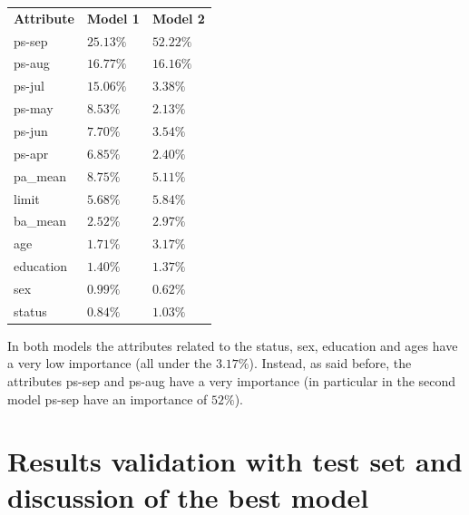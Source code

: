 \begin{table}[h]
\centering
\begin{adjustbox}{width=.3\textwidth}
\small
\begin{tabular}{lll}
\textbf{Attribute}  & \textbf{Model 1} & \textbf{Model 2} \\ \rowcolor[HTML]{EFEFEF} 
 ps-sep             &  $25.13\%$       & $52.22\%$        \\
 ps-aug             &  $16.77\%$       & $16.16\%$        \\ \rowcolor[HTML]{EFEFEF} 
 ps-jul             &  $15.06\%$       & $3.38\%$         \\
 ps-may             &  $8.53\%$        & $2.13\%$         \\ \rowcolor[HTML]{EFEFEF} 
 ps-jun             &  $7.70\%$        & $3.54\%$         \\
 ps-apr             &  $6.85\%$        & $2.40\%$         \\ \rowcolor[HTML]{EFEFEF} 
 pa\_mean           &  $8.75\%$        & $5.11\%$         \\
 limit              &  $5.68\%$        & $5.84\%$         \\ \rowcolor[HTML]{EFEFEF} 
 ba\_mean           &  $2.52\%$        & $2.97\%$         \\
 age                &  $1.71\%$        & $3.17\%$         \\ \rowcolor[HTML]{EFEFEF} 
 education          &  $1.40\%$        & $1.37\%$         \\
 sex                &  $0.99\%$        & $0.62\%$         \\ \rowcolor[HTML]{EFEFEF} 
 status             &  $0.84\%$        & $1.03\%$         \\
\end{tabular}
\end{adjustbox}
\end{table}

In both models the attributes related to the status, sex, education and ages have a very low importance (all under the $3.17\%$). Instead, as said before, the attributes ps-sep and ps-aug have a very importance (in particular in the second model ps-sep have an importance of $52\%$).

\section{Results validation with test set and discussion of the best model}

